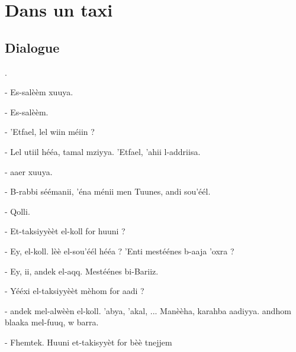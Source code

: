 \chapter{Dans un taxi}

\section{Dialogue}
.\newline

- Es-salèèm xuuya.

- Es-salèèm. 

- 'Etfa\cdh\cdh el, lel wiin mé\vs iin ?

- Lel utiil héé\dh a, ta\ca mal mziyya. 'Etfa\cdh\cdh el, 'ahii l-addriisa.

- \HB aa\dh er xuuya.

- B-rabbi sééma\hb nii, 'éna ménii\vs{} men Tuunes, \ca andi sou'éél. 

- Qolli.

- Et-taksiyyèèt el-koll \cs for huuni ?

- Ey, el-koll. \CA lèè\vs{} el-sou'éél héé\dh a ? 'Enti mestéénes b-\hb aaja 'oxra ?

- Ey, \cs\hb ii\hb{}, \ca andek el-\hb aqq. Mestéénes bi-Bariiz.

- Yééxi el-taksiyyèèt mèhom\vs{} \cs for \vr aadi ?

- \CA andek mel-alwèèn el-koll. 'abya\cdh, 'ak\hb al, ... Ma\ca nèèha, karahba \ca aadiyya. \CA andhom blaaka mel-fuuq, w barra.

- Fhemtek. Huuni et-takisyyèt \cs for bèè\vs{} tnejjem 